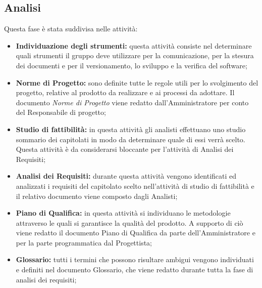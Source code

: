 \subsection{Analisi}
Questa fase è stata suddivisa nelle attività:
\begin{itemize}
	\item \textbf{Individuazione degli strumenti:} questa attività consiste nel determinare quali strumenti il gruppo deve utilizzare per la comunicazione, per la stesura dei documenti e per il versionamento, lo sviluppo e la verifica del software;
	\item \textbf{Norme di Progetto:} sono definite tutte le regole utili per lo svolgimento del progetto, relative al prodotto da realizzare e ai processi da adottare. Il documento \textit{Norme di Progetto} viene redatto dall’Amministratore per conto del Responsabile di progetto;
	\item \textbf{Studio di fattibilità:} in questa attività gli analisti effettuano uno studio sommario dei capitolati in modo da determinare quale di essi verrà scelto. Questa attività è da considerarsi bloccante per l’attività di Analisi dei Requisiti;
	\item \textbf{Analisi dei Requisiti:} durante questa attività vengono identificati ed analizzati i requisiti del capitolato scelto nell’attività di studio di fattibilità e il relativo documento viene composto dagli Analisti;
	\item \textbf{Piano di Qualifica:} in questa attività si individuano le metodologie attraverso le quali si garantisce la qualità del prodotto. A supporto di ciò viene redatto il documento Piano di Qualifica da parte dell’Amministratore e per la parte programmatica dal Progettista;
	\item \textbf{Glossario:} tutti i termini che possono risultare ambigui vengono individuati e definiti nel documento Glossario, che viene redatto durante tutta la fase di analisi dei requisiti;
\end{itemize}
